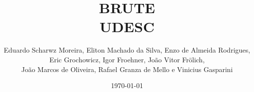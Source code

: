 \documentclass[10pt, a4paper, oneside]{book}
\title{BRUTE \\ UDESC}
\author{Eduardo Scharwz Moreira, Eliton Machado da Silva, Enzo de Almeida Rodrigues,\\
Eric Grochowicz, Igor Froehner, João Vitor Frölich,\\
João Marcos de Oliveira, Rafael Granza de Mello e Vinicius Gasparini}
\begin{document}
\twocolumn
\date{\today}
\maketitle

\renewcommand{\contentsname}{Índice} %

\tableofcontents
\end{document}
